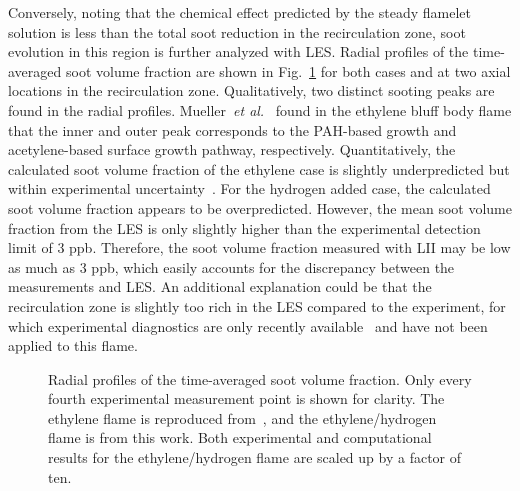 \documentclass[review,3p,times]{elsarticle}
\begin{document}
Conversely, noting that the chemical effect predicted by the steady flamelet solution is less than the total soot reduction in the recirculation zone, soot evolution in this region is further analyzed with LES.  Radial profiles of the time-averaged soot volume fraction are shown in Fig.~\ref{fig:fv_radial} for both cases and at two axial locations in the recirculation zone.  Qualitatively, two distinct sooting peaks are found in the radial profiles.  Mueller~\emph{et al.}~\cite{mueller13} found in the ethylene bluff body flame that the inner and outer peak corresponds to the PAH-based growth and acetylene-based surface growth pathway, respectively.  Quantitatively, the \textcolor{Rv1}{calculated} soot volume fraction of the ethylene case is slightly underpredicted but within experimental uncertainty~\cite{mueller13}.  For the hydrogen added case, the \textcolor{Rv1}{calculated }soot volume fraction appears to be overpredicted.  However, the mean soot volume fraction from the LES is only slightly higher than the experimental detection limit of 3 ppb.  \textcolor{Rv1}{Therefore, the soot volume fraction measured with LII may be low} as much as 3 ppb, which easily accounts for the discrepancy between the measurements and LES.  \textcolor{Rv1}{An additional explanation could be that the recirculation zone is slightly too rich in the LES compared to the experiment, for which experimental diagnostics are only recently available~\cite{buxton13} and have not been applied to this flame.}


\begin{figure}[t]
  \centering
  \scriptsize
  \resizebox{0.49\textwidth}{!}{}
  \resizebox{0.49\textwidth}{!}{}
  \vspace{-0.3in}
  \normalsize
  \caption{Radial profiles of the time-averaged soot volume fraction.  Only every fourth experimental measurement point is shown for clarity.  The ethylene flame is reproduced from~\cite{mueller13}, and the ethylene/hydrogen flame is from this work.  Both experimental and computational results for the ethylene/hydrogen flame are scaled up by a factor of ten.}
  \label{fig:fv_radial}
\end{figure}
\end{document}
